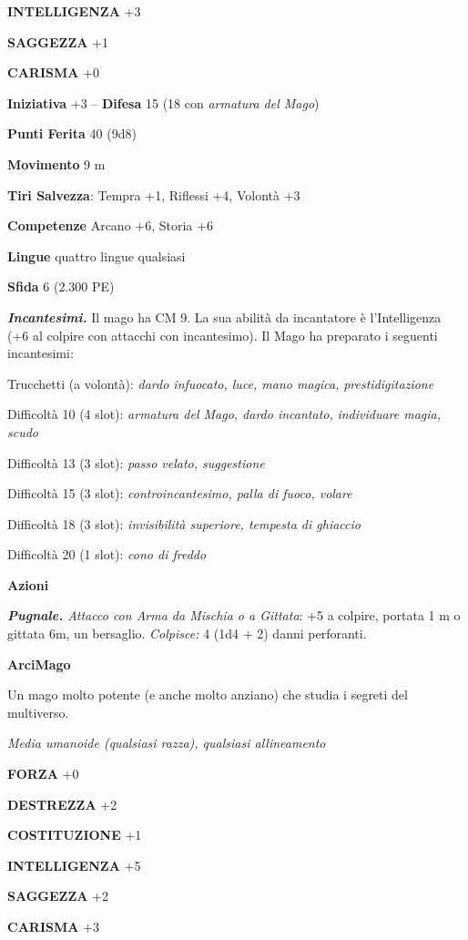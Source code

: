 \begin{multicols}{2}
\textbf{INTELLIGENZA} +3

\textbf{SAGGEZZA} +1

\textbf{CARISMA} +0

\textbf{Iniziativa} +3 -- \textbf{Difesa} 15 (18 con \emph{armatura del Mago})

\textbf{Punti Ferita} 40 (9d8)

\textbf{Movimento} 9 m

\textbf{Tiri Salvezza}: Tempra +1, Riflessi +4, Volontà +3 

\textbf{Competenze} Arcano +6, Storia +6

\textbf{Lingue} quattro lingue qualsiasi

\textbf{Sfida} 6 (2.300 PE)

\emph{\textbf{Incantesimi.}} Il mago ha CM 9. La sua abilità da incantatore è l'Intelligenza (+6 al colpire con attacchi con incantesimo). Il Mago ha preparato i seguenti incantesimi:

Trucchetti (a volontà): \emph{dardo infuocato, luce, mano magica,}
\emph{prestidigitazione}

Difficoltà 10 (4 slot): \emph{armatura del Mago, dardo incantato,}
\emph{individuare magia, scudo}

Difficoltà 13 (3 slot): \emph{passo velato, suggestione}

Difficoltà 15 (3 slot): \emph{controincantesimo, palla di fuoco, volare}

Difficoltà 18 (3 slot): \emph{invisibilità superiore, tempesta di ghiaccio}

Difficoltà 20 (1 slot): \emph{cono di freddo}

\textbf{Azioni}

\emph{\textbf{Pugnale.} Attacco con Arma da Mischia o a Gittata}: +5 a colpire, portata 1 m o gittata 6m, un bersaglio. \emph{Colpisce:} 4 (1d4 + 2) danni perforanti.

\medskip\textbf{ArciMago}

Un mago molto potente (e anche molto anziano) che studia i segreti del multiverso.

\emph{Media umanoide (qualsiasi razza), qualsiasi allineamento}

\textbf{FORZA} +0

\textbf{DESTREZZA} +2

\textbf{COSTITUZIONE} +1

\textbf{INTELLIGENZA} +5

\textbf{SAGGEZZA} +2

\textbf{CARISMA} +3


\end{multicols}
